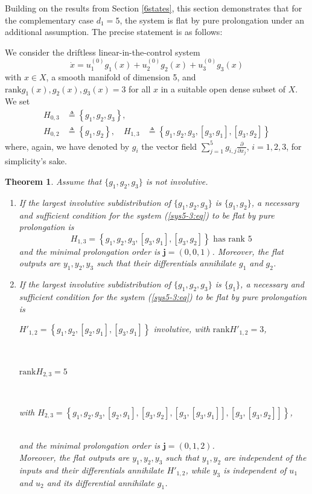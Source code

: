 \documentclass[10pt]{article}
\newcommand{\3}{\mathbf{3}}
\newcommand{\2}{\mathbf{2}}
\newcommand{\1}{\mathbf{1}}
\newcommand{\0}{\mathbf{0}}
\newcommand{\mbf}[1]{\mathbf{#1}}
\newcommand{\rk}{\mathrm{rank}}
\newcommand{\ddxx}[1]{\frac{\partial}{\partial x_{#1}}}
\newtheorem{thm}{Theorem}
\begin{document}
Building on the results from Section \ref{6states}, this section demonstrates that for the complementary case $d_1=5$, the system is flat by pure prolongation under an additional assumption. The precise statement is as follows:


We consider the driftless linear-in-the-control system
\begin{equation}\label{sys5-3:eq}
\dot{x} = u_{1}^{(0)}g_{1}(x) + u_{2}^{(0)}g_{2}(x) + u_{3}^{(0)}g_{3}(x)
\end{equation}
with  $x \in X$, a smooth manifold of dimension 5, and $\rk{g_{1}(x), g_{2}(x), g_{3}(x)} = 3$ for all $x$ in a suitable open dense subset of $X$.
We set
\begin{equation}
\begin{aligned}
H_{0,3}&\triangleq \left\{g_{1}, g_{2}, g_{3}\right\},\\
H_{0,2}&\triangleq \left\{g_{1}, g_{2}\right\}, \quad H_{1,3} &\triangleq \left\{g_{1}, g_{2}, g_{3}, [g_{3},g_{1}], [g_{3},g_{2}]\right\}
\end{aligned}
\end{equation}
where, again, we have denoted by $g_{i}$ the vector field $\sum_{j=1}^{5}g_{i,j}\ddxx{j}$, $i=1,2,3$, for simplicity's sake.

\begin{thm}
\label{3-5theorem}
Assume that $\{g_1,g_2,g_3\}$ is not involutive.

\begin{enumerate}
  \item If the largest involutive subdistribution of $\{g_1,g_2,g_3\}$ is $\{g_1,g_2\}$, a necessary and sufficient condition for the system (\ref{sys5-3:eq}) to be flat by pure prolongation is
      \[ H_{1,3}=\left\{g_1,g_2,g_3,[g_{3},g_{1}], [g_{3},g_{2}]\right\} \mbox{ has rank $5$ } \]
      and the minimal prolongation  order is $\mbf{j}= (0,0,1)$. Moreover, the flat outputs are $y_1,y_2,y_3$ such that their differentials annihilate $g_1$ and $g_2$.
  \item If the largest involutive subdistribution of $\{g_1,g_2,g_3\}$ is $\{g_1\}$, a necessary and sufficient condition for the system (\ref{sys5-3:eq}) to be flat by pure prolongation is \\
\centerline{$H'_{1,2} =  \left\{g_{1}, g_{2}, [g_{2},g_{1}], [g_{3},g_{1}]\right\}$ involutive, with $\rk H' _{1,2} = 3$,}\\
\centerline{$\rk H_{2,3} = 5$}\\
\centerline{ with $H_{2,3} = \left\{g_{1}, g_{2}, g_{3}, [g_{2},g_{1}], [g_{3},g_{2}], [g_{3},[g_{3},g_{1}]], [g_{3},[g_{3},g_{2}]] \right\}$,}\\
 and the minimal prolongation order is $\mbf{j}= (0,1,2)$. \\
 Moreover, the flat outputs are $y_1,y_2,y_3$ such that $y_1,y_2$ are independent of the inputs and their differentials annihilate $H'_{1,2}$, while $y_3$ is independent of $u_1$ and $u_2$ and its differential annihilate $g_1$.
\end{enumerate}
\end{thm}
\end{document}
